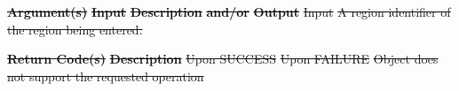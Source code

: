 \documentclass[12pt]{report} %
\providecommand{\DIFdeltex}[1]{{\protect\color{red}\sout{#1}}}                      %
\providecommand{\DIFdel}[1]{\texorpdfstring{\DIFdeltex{#1}}{}} %
\begin{document}
\textbf{\DIFdel{Argument(s)}} %
\textbf{\DIFdel{Input}}  %
\textbf{\DIFdel{Description}} %
\textbf{\DIFdel{and/or}}     %
\textbf{\DIFdel{Output}} %
\DIFdel{Input }%
\DIFdel{A region identifier of the region being entered. }%

\textbf{\DIFdel{Return Code(s)}} %
\textbf{\DIFdel{Description}} %
\DIFdel{Upon SUCCESS }%
\DIFdel{Upon FAILURE }%
\DIFdel{Object does not support the requested operation }%
\end{document}
